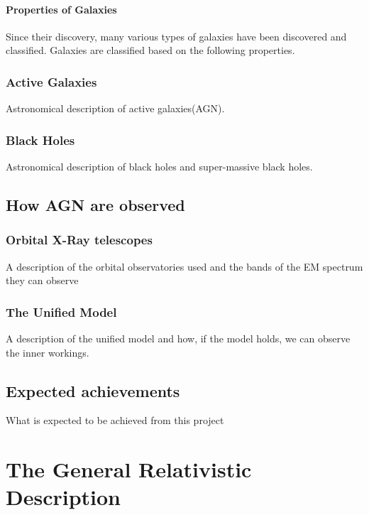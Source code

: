 \documentclass[12pt, oneside]{smuthesis}
\begin{document}
\subsubsection{\sc Properties of Galaxies}
Since their discovery, many various types of galaxies have been discovered and classified. Galaxies are classified based on the following properties.

\subsection{\sc Active Galaxies}

Astronomical description of active galaxies(AGN).

\subsection{\sc Black Holes}

Astronomical description of black holes and super-massive black holes.


\section{\sc How AGN are observed}

\subsection{\sc Orbital X-Ray telescopes}

A description of the orbital observatories used and the bands of the EM spectrum they can observe

\subsection{\sc The Unified Model}

A description of the unified model and how, if the model holds, we can observe the inner workings.

\section{\sc Expected achievements}

What is expected to be achieved from this project

\newpage

\chapter{\sc The General Relativistic Description}
\end{document}
